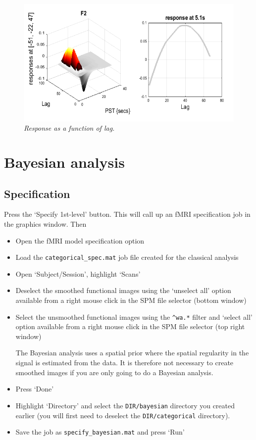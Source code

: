 \documentclass[a4paper,titlepage]{book}
\newcommand{\bi}{\begin{itemize}}
\newcommand{\ei}{\end{itemize}}
\begin{document}
\begin{figure}
\begin{center}
\includegraphics[width=150mm]{faces/famous_lag}
\caption{\em Response as a function of lag. \label{famous_lag} }
\end{center}
\end{figure}


\section{Bayesian analysis}


\subsection{Specification}

Press the `Specify 1st-level' button. This will call up an fMRI specification job in the graphics window. Then

\bi
\item{Open the fMRI model specification option}
\item{Load the \verb!categorical_spec.mat! job file created for the 
classical analysis}
\item{Open `Subject/Session', highlight `Scans'} \item{Deselect the smoothed functional images using the `unselect all' option available from a right mouse click in the SPM file selector (bottom window)}
\item{Select the 
unsmoothed functional images using the \verb!^wa.*! filter and `select all' option available from a right mouse click in the SPM file selector (top right window)

The Bayesian analysis uses a spatial prior where the spatial regularity in the signal is estimated from the data. It is therefore not necessary to create smoothed images if you are only going to do a Bayesian analysis.}
\item{Press `Done'}
\item{Highlight `Directory' and select the 
\verb!DIR/bayesian! directory you created earlier (you will first need to deselect the \verb!DIR/categorical! directory).}
\item{Save the job as \verb!specify_bayesian.mat! and press `Run'}
\ei
\end{document}
